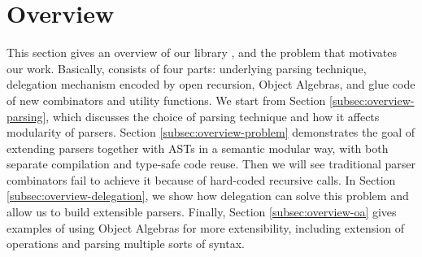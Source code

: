 \section{Overview}\label{sec:overview}

This section gives an overview of our library \name, and the problem that motivates our work. Basically, \name consists of four parts: underlying parsing technique, delegation mechanism encoded by open recursion, Object Algebras, and glue code of new combinators and utility functions. We start from Section \ref{subsec:overview-parsing}, which discusses the choice of parsing technique and how it affects modularity of parsers. Section \ref{subsec:overview-problem} demonstrates the goal of extending parsers together with ASTs in a semantic modular way, with both separate compilation and type-safe code reuse. Then we will see traditional parser combinators fail to achieve it because of hard-coded recursive calls. In Section \ref{subsec:overview-delegation}, we show how delegation can solve this problem and allow us to build extensible parsers. Finally, Section \ref{subsec:overview-oa} gives examples of using Object Algebras for more extensibility, including extension of operations and parsing multiple sorts of syntax.


